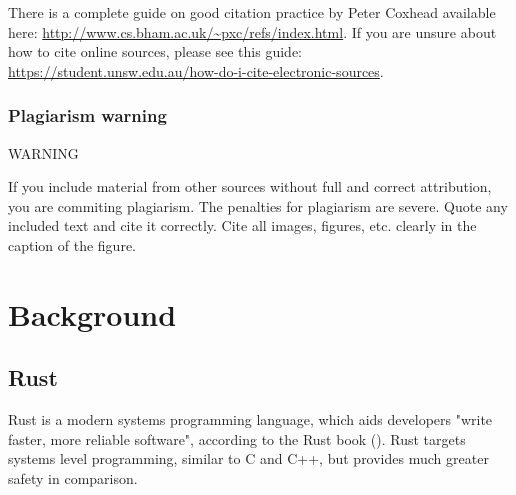 \documentclass{l4proj}
\begin{document}


There is a complete guide on good citation practice by Peter Coxhead available here: \url{http://www.cs.bham.ac.uk/~pxc/refs/index.html}. 
If you are unsure about how to cite online sources, please see this guide: \url{https://student.unsw.edu.au/how-do-i-cite-electronic-sources}.

\subsection{Plagiarism warning}

\begin{highlight_title}{WARNING}
    
    If you include material from other sources without full and correct attribution, you are commiting plagiarism. The penalties for plagiarism are severe.
    Quote any included text and cite it correctly. Cite all images, figures, etc. clearly in the caption of the figure.
\end{highlight_title}


\chapter{Background}

\section{Rust}

Rust is a modern systems programming language, which aids developers "write faster, more reliable software", according
to the Rust book (\cite{kalbnik_rust_nodate}).
Rust targets systems level programming, similar to C and C++, but provides much greater safety in comparison.
\end{document}
